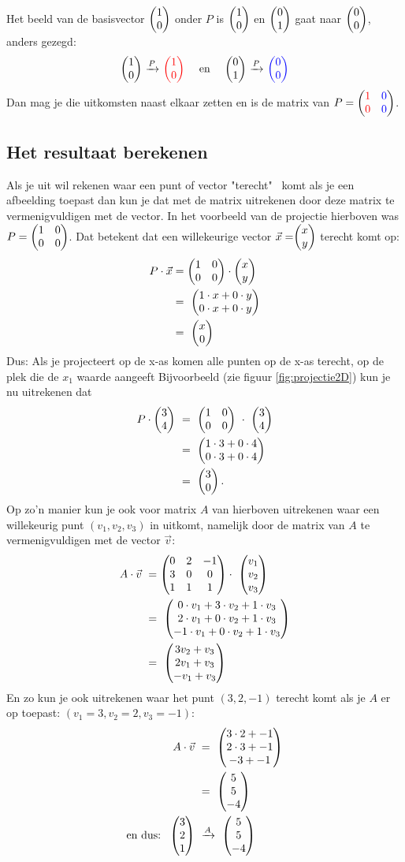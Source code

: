 Het beeld van de basisvector $\vectwee{1}{0} $ onder $P$ is $\vectwee{1}{0} $ en $\vectwee{0}{1} $ gaat naar $ \vectwee{0}{0} $, anders gezegd:
\[ 
    \vectwee{1}{0} \ \xrightarrow{P} \ \vectwee[red]{1}{0} \quad \text{ en } \quad 
    \vectwee{0}{1} \ \xrightarrow{P} \ \vectwee[blue]{0}{0} 
\]
Dan mag je die uitkomsten naast elkaar zetten en is de matrix van $P = \begin{pmatrix} {\color{red}1}&{\color{blue}0} \\ {\color{red}0}&{\color{blue}0} \end{pmatrix}$.

\subsection{Het resultaat berekenen}
Als je uit wil rekenen waar een punt of vector "terecht" \ komt als je een afbeelding toepast dan kun je dat met de matrix uitrekenen door deze matrix te vermenigvuldigen met de vector. In het voorbeeld van de projectie hierboven was $P = \begin{pmatrix} 1&0 \\ 0&0 \end{pmatrix} $. Dat betekent dat een willekeurige vector $\vec{x} = \vectwee{x}{y} $  terecht komt op: 
\begin{align*}
    P\cdot \vec{x} &= \begin{pmatrix} 1&0 \\ 0&0 \end{pmatrix} \cdot \begin{pmatrix} x \\ y \end{pmatrix} \\
    &= \ \begin{pmatrix} 1\cdot x + 0\cdot y \\ 0\cdot x + 0\cdot y \end{pmatrix}  \\
    &= \ \begin{pmatrix} x \\ 0 \end{pmatrix}  
\end{align*}
Dus: Als je projecteert op de x-as komen alle punten  op de x-as terecht, op de plek die de $ x_1 $ waarde aangeeft Bijvoorbeeld (zie figuur \ref{fig:projectie2D}) kun je nu uitrekenen dat
\begin{align*}
    P \cdot \mattwee{3}{4} \ &=\ \mattwee{1&0}{0&0} \ \cdot\ \mattwee{3}{4} \\
    &=\ \mattwee{1\cdot 3 + 0\cdot 4}{0\cdot 3 + 0\cdot 4} \\
    &=\ \mattwee{3}{0}.  
\end{align*}
Op zo'n manier kun je ook voor  matrix $A$ van hierboven uitrekenen waar een willekeurig punt $(v_1, v_2, v_3)$ in \RD uitkomt, namelijk door de matrix van $A$ te vermenigvuldigen met de vector $\vec{v}$:
\begin{align*}
    A\cdot \vec{v}\ &=\matdrie{0&2&-1}{3&0&0}{1&1&1} \cdot\ \matdrie{v_1}{v_2}{v_3} \\
                    &=\ \matdrie{0\cdot v_1 + 3\cdot v_2 + 1\cdot v_3}{2\cdot v_1 + 0\cdot v_2+ 1\cdot v_3}{-1\cdot v_1 + 0\cdot v_2 + 1\cdot v_3}  \\
                    &=\ \matdrie{3v_2 + v_3}{2v_1 +  v_3}{-v_1 +  v_3} 
\end{align*}
En zo kun je ook  uitrekenen waar het punt $(3,2,-1)$ terecht komt als je $A$ er op toepast: $(v_1 = 3, v_2 = 2 ,  v_3=-1 )$: 
\begin{align*}
    A\cdot \vec{v}\ &=\ \matdrie{3\cdot 2 + -1}{2\cdot 3+  -1}{-3 +  -1} \\
                    &=\ \matdrie{5}{5}{-4} \\
    \text{en dus:} \ \ \matdrie{3}{2}{1}\ & \xrightarrow{A}\ \matdrie{5}{5}{-4}
\end{align*}

